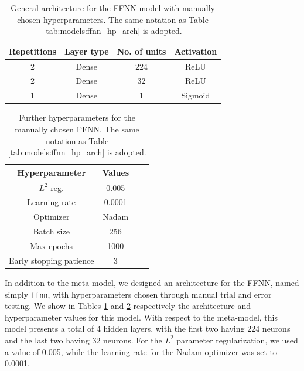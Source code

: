 \documentclass{article}
\begin{document}
\begin{table}
    \centering
    \begin{tabular}{cccc}
        \toprule
        Repetitions & Layer type & No. of units & Activation \\
        \midrule
        2 & Dense & 224 & ReLU \\
        2 & Dense & 32 & ReLU \\
        1 & Dense & 1 & Sigmoid \\
        \bottomrule
    \end{tabular}
    \caption{General architecture for the FFNN model with manually chosen hyperparameters. The same notation as Table \ref{tab:models:ffnn_hp_arch} is adopted.}
    \label{tab:models:ffnn_manual_arch}
\end{table}

\begin{table}
    \centering
    \begin{tabular}{cccc}
        \toprule
        Hyperparameter & Values \\
        \midrule
        $L^2$ reg. & 0.005 \\
        Learning rate & 0.0001 \\
        Optimizer & Nadam \\
        Batch size & 256 \\
        Max epochs & 1000 \\
        Early stopping patience & 3 \\
        \bottomrule
    \end{tabular}
    \caption{Further hyperparameters for the manually chosen FFNN. The same notation as Table \ref{tab:models:ffnn_hp_arch} is adopted.}
    \label{tab:models:ffnn_manual_hps}
\end{table}

In addition to the meta-model, we designed an architecture for the FFNN, named simply \texttt{ffnn}, with hyperparameters chosen through manual trial and error testing. We show in Tables \ref{tab:models:ffnn_manual_arch} and \ref{tab:models:ffnn_manual_hps} respectively the architecture and hyperparameter values for this model. With respect to the meta-model, this model presents a total of 4 hidden layers, with the first two having 224 neurons and the last two having 32 neurons. For the $L^2$ parameter regularization, we used a value of 0.005, while the learning rate for the Nadam optimizer was set to 0.0001.
\end{document}
